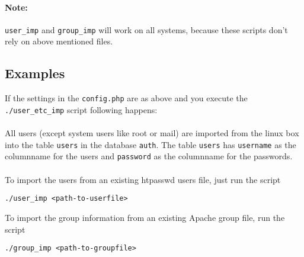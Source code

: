 \paragraph{Note:}{{\tt user\_imp} and {\tt group\_imp} will work on all systems, because these scripts don't rely on above mentioned files.}
\subsection{Examples}
If the settings in the {\tt config.php} are as above and you execute the {\tt ./user\_etc\_imp} script following happens:\\
\\
All users (except system users like root or mail) are imported from the linux box into the table {\tt users} in the database {\tt auth}.
The table {\tt users} has {\tt username} as the columnname for the users and {\tt password} as the columnname for the passwords.\\
\\
To import the users from an existing htpasswd users file, just run the script
\begin{verbatim}
./user_imp <path-to-userfile>
\end{verbatim}
To import the group information from an existing Apache group file, run the script
\begin{verbatim}
./group_imp <path-to-groupfile>
\end{verbatim}